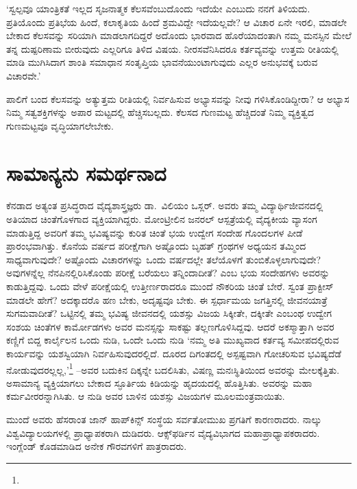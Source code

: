 ‘ಸ್ವಲ್ಪವೂ ಯಾಂತ್ರಿಕತೆ ಇಲ್ಲದ ಸೃಜನಾತ್ಮಕ ಕೆಲಸವೆಂಬುದೊಂದು ಇದೆಯೇ ಎಂಬುದು ನನಗೆ ತಿಳಿಯದು. ಪ್ರತಿಯೊಂದು ಪ್ರತಿಭೆಯ ಹಿಂದೆ, ಕಲಾಕೃತಿಯ ಹಿಂದೆ ಶ್ರಮವಿದ್ದೇ ಇದೆ\-ಯಲ್ಲವೇ? ಆ ವಿಚಾರ ಏನೇ ಇರಲಿ, ಮಾಡಲೇ ಬೇಕಾದ ಕೆಲಸವನ್ನು ಸರಿಯಾಗಿ ಮಾಡಲಾಗದಿದ್ದರೆ ಅದೊಂದು ಭಾರವಾದ ಹೊರೆಯಾದಂತಾಗಿ ನಮ್ಮ ಮನಸ್ಸಿನ ಮೇಲೆ ತನ್ನ ದುಷ್ಪರಿಣಾಮ ಬೀರುವುದು ಎಲ್ಲರಿಗೂ ತಿಳಿದ ವಿಷಯ. ನೀರಸವೆನಿಸಿದರೂ ಕರ್ತವ್ಯವನ್ನು ಉತ್ತಮ ರೀತಿಯಲ್ಲಿ ಮಾಡಿ ಮುಗಿಸಿದಾಗ ಶಾಂತಿ ಸಮಾಧಾನ ಸಂತೃಪ್ತಿಯ ಭಾವನೆಯುಂಟಾಗುವುದು ಎಲ್ಲರ ಅನುಭವಕ್ಕೆ ಬರುವ ವಿಚಾರವೇ.’

ಪಾಲಿಗೆ ಬಂದ ಕೆಲಸವನ್ನು ಅತ್ಯುತ್ತಮ ರೀತಿಯಲ್ಲಿ ನಿರ್ವಹಿಸುವ ಅಭ್ಯಾಸವನ್ನು ನೀವು ಗಳಿಸಿಕೊಂಡಿದ್ದೀರಾ? ಆ ಅಭ್ಯಾಸ ನಿಮ್ಮ ಸತ್ವಶಕ್ತಿಗಳನ್ನು ಅಪಾರ ಮಟ್ಟದಲ್ಲಿ ಹೆಚ್ಚಿಸಬಲ್ಲದು. ಕೆಲಸದ ಗುಣಮಟ್ಟ ಹೆಚ್ಚಿದಂತೆ ನಿಮ್ಮ ವ್ಯಕ್ತಿತ್ವದ ಗುಣಮಟ್ಟವೂ ವೃದ್ಧಿಯಾಗಲೇಬೇಕು.


\section*{ಸಾಮಾನ್ಯನು ಸಮರ್ಥನಾದ}


ಕೆನಡಾದ ಅತ್ಯಂತ ಪ್ರಸಿದ್ಧರಾದ ವೈದ್ಯಶಾಸ್ತ್ರಜ್ಞರು ಡಾ.\ ವಿಲಿಯಂ ಒಸ್ಲರ್. ಅವರು ತಮ್ಮ ವಿದ್ಯಾರ್ಥಿಜೀವನದಲ್ಲಿ ಅತಿಯಾದ ಚಿಂತೆಗೊಳಗಾದ ವ್ಯಕ್ತಿಯಾಗಿದ್ದರು. ಮೋಂಟ್ರೀಲಿನ ಜನರಲ್ ಆಸ್ಪತ್ರೆಯಲ್ಲಿ ವೈದ್ಯಕೀಯ ವ್ಯಾಸಂಗ ಮಾಡುತ್ತಿದ್ದ ಅವರಿಗೆ ತಮ್ಮ ಭವಿಷ್ಯವನ್ನು ಕುರಿತ ಚಿಂತೆ ಭಯ ಉದ್ವೇಗ ಸಂದೇಹ ಗೊಂದಲಗಳ ಪೀಡೆ ಪ್ರಾರಂಭವಾಗಿತ್ತು. ಕೊನೆಯ ವರ್ಷದ ಪರೀಕ್ಷೆಗಾಗಿ ಅಷ್ಟೊಂದು ಬೃಹತ್ ಗ್ರಂಥಗಳ ಅಧ್ಯಯನ ತಮ್ಮಿಂದ ಸಾಧ್ಯವಾಗುವುದೇ? ಅಷ್ಟೊಂದು ವಿಚಾರಗಳನ್ನು ಒಂದು ವರ್ಷದಲ್ಲೇ ತಲೆಯೊಳಗೆ ತುಂಬಿಕೊಳ್ಳಲಾಗುವುದೇ? ಅವುಗಳನ್ನೆಲ್ಲ ನೆನಪಿನಲ್ಲಿರಿಸಿಕೊಂಡು ಪರೀಕ್ಷೆ ಬರೆಯಲು ತನ್ನಿಂದಾದೀತೆ? ಎಂಬ ಭಯ ಸಂದೇಹಗಳು ಅವರನ್ನು ಕಾಡುತ್ತಿದ್ದವು. ಒಂದು ವೇಳೆ ಪರೀಕ್ಷೆಯಲ್ಲಿ ಉತ್ತೀರ್ಣರಾದರೂ ಮುಂದೆ ನೌಕರಿಯ ಚಿಂತೆ ಬೇರೆ. ಸ್ವಂತ ಪ್ರಾಕ್ಟೀಸ್ ಮಾಡಲೇ ಹೇಗೆ? ಅದಕ್ಕಾದರೊ ಹಣ ಬೇಕು, ಅದೃಷ್ಟವೂ ಬೇಕು. ಈ ಸ್ಪರ್ಧಾಮಯ ಜಗತ್ತಿನಲ್ಲಿ ಜೀವನಯಾತ್ರೆ ಸುಗಮವಾದೀತೆ? ಒಟ್ಟಿನಲ್ಲಿ ತಮ್ಮ ಭವಿಷ್ಯ ಜೀವನದಲ್ಲಿ ಯಶಸ್ಸು ವಿಜಯ ಸಿಕ್ಕೀತೇ, ದಕ್ಕೀತೇ ಎಂಬಂಥ ಉದ್ವೇಗ ಸಂಶಯ ಚಿಂತೆಗಳ ಕಾರ್ಮೋಡಗಳು ಅವರ ಮನಸ್ಸನ್ನು ಸಾಕಷ್ಟು ತಲ್ಲಣಗೊಳಿಸಿದ್ದವು. ಆದರೆ ಅಕಸ್ಮಾತ್ತಾಗಿ ಅವರ ಕಣ್ಣಿಗೆ ಬಿದ್ದ ಕಾರ್ಲೈಲನ ಒಂದು ನುಡಿ, ಒಂದೇ ಒಂದು ನುಡಿ ‘ನಮ್ಮ ಅತಿ ಮುಖ್ಯವಾದ ಕರ್ತವ್ಯ ಸಮೀಪದಲ್ಲಿರುವ ಕಾರ್ಯವನ್ನು ಯಶಸ್ವಿಯಾಗಿ ನಿರ್ವಹಿಸುವುದರಲ್ಲಿದೆ. ದೂರದ ದಿಗಂತದಲ್ಲಿ ಅಸ್ಪಷ್ಟವಾಗಿ ಗೋಚರಿಸುವ ಭವಿಷ್ಯದೆಡೆ ನೋಡುವುದರಲ್ಲಲ್ಲ,’\footnote{\hfill{}} –ಅವರ ಬದುಕಿನ ದಿಕ್ಕನ್ನೇ ಬದಲಿಸಿತು, ವಿಷಣ್ಣ ಮನಃಸ್ಥಿತಿಯಿಂದ ಅವರನ್ನು ಮೇಲಕ್ಕೆತ್ತಿತು. ಅಸಾಮಾನ್ಯ ವ್ಯಕ್ತಿಯಾಗಲು ಬೇಕಾದ ಸ್ಫೂರ್ತಿಯ ಕಿಡಿಯನ್ನು ಹೃದಯದಲ್ಲಿ ಹೊತ್ತಿಸಿತು. ಅವರನ್ನು ಮಹಾ ಕರ್ಮವೀರರನ್ನಾಗಿಸಿತು. ಆ ನುಡಿ ಅವರ ಬಾಳಿನ ಯಶಸ್ಸು ವಿಜಯಗಳ ಮೂಲಮಂತ್ರವಾಯಿತು.

\vskip 2pt

ಮುಂದೆ ಅವರು ಹೆಸರಾಂತ ಜಾನ್ ಹಾಪ್​ಕಿನ್ಸ್ ಸಂಸ್ಥೆಯ ಸರ್ವತೋಮುಖ ಪ್ರಗತಿಗೆ ಕಾರಣರಾದರು. ನಾಲ್ಕು ವಿಶ್ವವಿದ್ಯಾಲಯಗಳಲ್ಲಿ ಪ್ರಾಧ್ಯಾಪಕರಾಗಿ ದುಡಿದರು. ಆಕ್ಸ್​ಫರ್ಡಿನ ವೈದ್ಯವಿಭಾಗದ ಮಹಾಪ್ರಾಧ್ಯಾಪಕರಾದರು. ಇಂಗ್ಲೆಂಡ್ ಕೊಡಮಾಡಿದ ಅನೇಕ ಗೌರವಗಳಿಗೆ ಪಾತ್ರರಾದರು.

